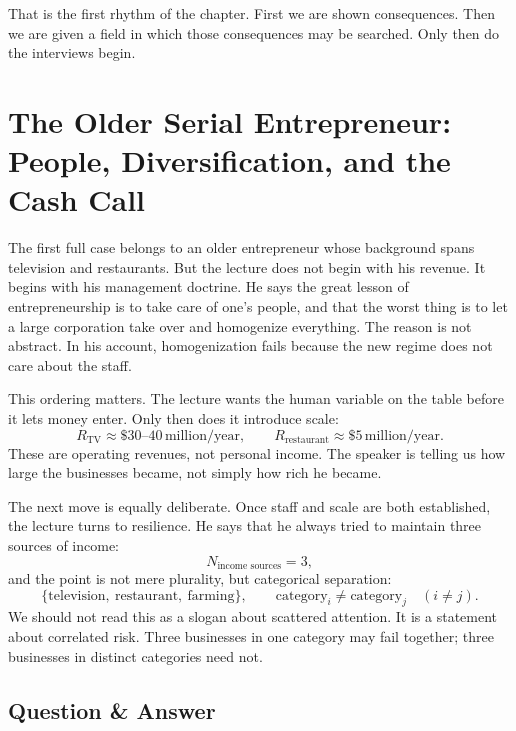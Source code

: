 That is the first rhythm of the chapter. First we are shown consequences. Then we are given a field in which those consequences may be searched. Only then do the interviews begin.

\section{The Older Serial Entrepreneur: People, Diversification, and the Cash Call}

The first full case belongs to an older entrepreneur whose background spans television and restaurants. But the lecture does not begin with his revenue. It begins with his management doctrine. He says the great lesson of entrepreneurship is to take care of one's people, and that the worst thing is to let a large corporation take over and homogenize everything. The reason is not abstract. In his account, homogenization fails because the new regime does not care about the staff.

This ordering matters. The lecture wants the human variable on the table before it lets money enter. Only then does it introduce scale:
\begin{equation}
R_{\text{TV}} \approx \$30\text{--}40\,\text{million/year},\qquad
R_{\text{restaurant}} \approx \$5\,\text{million/year}.
\end{equation}
These are operating revenues, not personal income. The speaker is telling us how large the businesses became, not simply how rich he became.

The next move is equally deliberate. Once staff and scale are both established, the lecture turns to resilience. He says that he always tried to maintain three sources of income:
\begin{equation}
N_{\text{income sources}} = 3,
\end{equation}
and the point is not mere plurality, but categorical separation:
\begin{equation}
\{\text{television},\ \text{restaurant},\ \text{farming}\},
\qquad
\text{category}_i \neq \text{category}_j \quad (i\neq j).
\end{equation}
We should not read this as a slogan about scattered attention. It is a statement about correlated risk. Three businesses in one category may fail together; three businesses in distinct categories need not.

\subsection{Question \& Answer}

